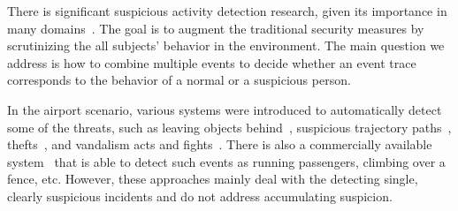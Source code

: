 There is significant suspicious activity detection research, given its importance in many domains~\citep{Arsic, Duong2005, Helman1993, Vaswani}. The goal is to augment the traditional security measures by scrutinizing the all subjects' behavior in the environment. 
%
The main question we address is how to combine multiple events to decide whether an event trace corresponds to the behavior of a normal or a suspicious person. 







In the airport scenario, various systems were introduced to automatically detect some of the threats, such as leaving objects behind~\citep{Hongeng2003}, suspicious trajectory paths~\citep{Vaswani}, 
thefts~\citep{Hongeng2003}, and vandalism acts and fights~\citep{AdvisorProject}. 
There is also a commercially available system~\citep{IBMsmart} that is able to detect such events as running passengers, climbing over a fence, etc.  
However, these approaches mainly deal with the detecting single, clearly suspicious incidents and do not address accumulating suspicion.


